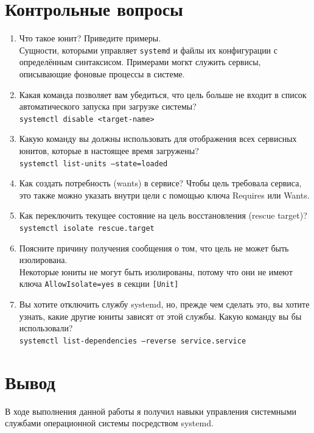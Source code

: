 \documentclass[12pt]{article}
\begin{document}
\section{Контрольные вопросы}
\begin{enumerate}
	\item Что такое юнит? Приведите примеры. \\
	      Сущности, которыми управляет \texttt{systemd} и файлы их конфигурации с определённым синтаксисом. Примерами могкт служить сервисы, описывающие фоновые процессы в системе.
	\item Какая команда позволяет вам убедиться, что цель больше не входит в список автоматического запуска при загрузке системы? \\
	      \texttt{systemctl disable <target-name>}
	\item Какую команду вы должны использовать для отображения всех сервисных юнитов, которые в настоящее время загружены? \\
	      \texttt{systemctl list-units --state=loaded}
	\item Как создать потребность (wants) в сервисе?
	      Чтобы цель требовала сервиса, это также можно указать внутри цели с помощью ключа Requires или Wants.
	\item Как переключить текущее состояние на цель восстановления (rescue target)? \\
	      \texttt{systemctl isolate rescue.target}
	\item Поясните причину получения сообщения о том, что цель не может быть изолирована. \\
	      Некоторые юниты не могут быть изолированы, потому что они не имеют ключа \texttt{AllowIsolate=yes} в секции \texttt{[Unit]}
	\item Вы хотите отключить службу systemd, но, прежде чем сделать это, вы хотите узнать, какие другие юниты зависят от этой службы. Какую команду вы бы использовали? \\
	      \texttt{systemctl list-dependencies --reverse service.service}
\end{enumerate}

\section{Вывод}
В ходе выполнения данной работы я получил навыки управления системными службами операционной системы посредством systemd.
\end{document}
